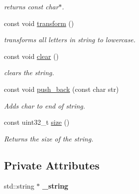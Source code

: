 \begin{DoxyCompactItemize}
\begin{DoxyCompactList}\small\item\em returns const char$\ast$. \end{DoxyCompactList}\item 
const void \hyperlink{class_ensum_1_1string_ad183e0697bed62d8e5639d17a5288a15}{transform} ()\hypertarget{class_ensum_1_1string_ad183e0697bed62d8e5639d17a5288a15}{}\label{class_ensum_1_1string_ad183e0697bed62d8e5639d17a5288a15}

\begin{DoxyCompactList}\small\item\em transforms all letters in string to lowercase. \end{DoxyCompactList}\item 
const void \hyperlink{class_ensum_1_1string_a27c098c250b2df7ed3fa935e0d318fe2}{clear} ()\hypertarget{class_ensum_1_1string_a27c098c250b2df7ed3fa935e0d318fe2}{}\label{class_ensum_1_1string_a27c098c250b2df7ed3fa935e0d318fe2}

\begin{DoxyCompactList}\small\item\em clears the string. \end{DoxyCompactList}\item 
const void \hyperlink{class_ensum_1_1string_af373cc0f29c09f8df78e3b96d279b609}{push\+\_\+back} (const char str)\hypertarget{class_ensum_1_1string_af373cc0f29c09f8df78e3b96d279b609}{}\label{class_ensum_1_1string_af373cc0f29c09f8df78e3b96d279b609}

\begin{DoxyCompactList}\small\item\em Adds char to end of string. \end{DoxyCompactList}\item 
const uint32\+\_\+t \hyperlink{class_ensum_1_1string_a04acaefb945a58e8443e8ca8bb9e44a4}{size} ()\hypertarget{class_ensum_1_1string_a04acaefb945a58e8443e8ca8bb9e44a4}{}\label{class_ensum_1_1string_a04acaefb945a58e8443e8ca8bb9e44a4}

\begin{DoxyCompactList}\small\item\em Returns the size of the string. \end{DoxyCompactList}\end{DoxyCompactItemize}
\subsection*{Private Attributes}
\begin{DoxyCompactItemize}
\item 
std\+::string $\ast$ {\bfseries \+\_\+string}\hypertarget{class_ensum_1_1string_aab7e7b28d0303d683f579b84754e761f}{}\label{class_ensum_1_1string_aab7e7b28d0303d683f579b84754e761f}

\end{DoxyCompactItemize}


